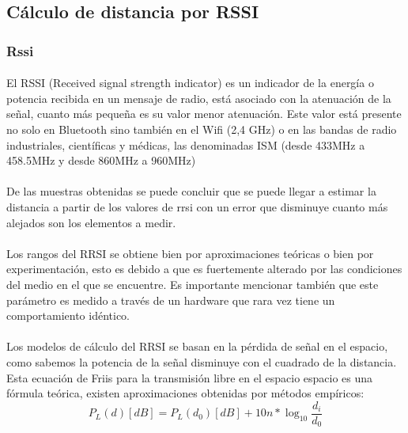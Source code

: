 \documentclass[a4paper ,12pt, onecolumn]{article}
\begin{document}
    \subsection{Cálculo de distancia por RSSI}
            \subsubsection{Rssi}
                \paragraph{}
                El RSSI (Received signal strength indicator) es un indicador de la energía o potencia recibida en un mensaje de radio, 
                está asociado con la atenuación de la señal, cuanto más pequeña es su valor menor atenuación. Este valor está 
                presente no solo en Bluetooth sino también en el Wifi (2,4 GHz) o en las bandas de radio industriales, científicas y médicas,
                las denominadas ISM (desde 433MHz a 458.5MHz y desde 860MHz a 960MHz)
                \paragraph{}
                De las muestras obtenidas se puede concluir que se puede llegar a estimar la distancia a partir de los valores
                de rrsi con un error que disminuye cuanto más alejados son los elementos a medir. 
                \paragraph{}
                Los rangos del RRSI se obtiene bien por aproximaciones teóricas o bien por experimentación, esto es debido a que 
                es fuertemente alterado por las condiciones del medio en el que se encuentre. Es importante mencionar también que
                este parámetro es medido a través de un hardware que rara vez tiene un comportamiento idéntico.
                \paragraph{}
                Los modelos de cálculo del RRSI se basan en la pérdida de señal en el espacio, como sabemos la potencia de la señal
                disminuye con el cuadrado de la distancia. Esta ecuación de Friis para la transmisión libre en el espacio espacio es 
                una fórmula teórica, existen aproximaciones obtenidas por métodos empíricos:
                \begin{equation}
                    P_L(d) [dB] = P_L(d_0) [dB] + 10n *\log_{10} \frac{ d_i }{d_0} 
                \end{equation}
\end{document}
